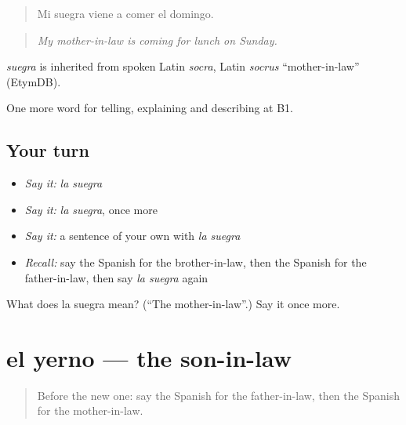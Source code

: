 \begin{quote}
Mi suegra viene a comer el domingo.
\end{quote}

\begin{quote}
\emph{My mother-in-law is coming for lunch on Sunday.}
\end{quote}

\begin{cousinweb}
\emph{suegra} is inherited from spoken Latin \emph{socra}, Latin \emph{socrus} \textquotedblleft{}mother-in-law\textquotedblright{} (EtymDB).
\end{cousinweb}

\begin{grammarlens}[title={What you've built}]
One more word for telling, explaining and describing at B1.
\end{grammarlens}

\subsection*{Your turn}
\begin{itemize}
\raggedright
  \item \emph{Say it:} \emph{la suegra}
  \item \emph{Say it:} \emph{la suegra}, once more
  \item \emph{Say it:} a sentence of your own with \emph{la suegra}
  \item \emph{Recall:} say the Spanish for the brother-in-law, then the Spanish for the father-in-law, then say \emph{la suegra} again
\end{itemize}

\begin{tcolorbox}[breakable,colback=teal!4,colframe=teal!35!black,title={Before you move on}]
What does la suegra mean? (\textquotedblleft{}The mother-in-law\textquotedblright{}.) Say it once more.
\end{tcolorbox}
\section[el yerno]{el yerno — the son-in-law}

\label{lesson:ES-C747-yerno}



\begin{quote}
Before the new one: say the Spanish for the father-in-law, then the Spanish for the mother-in-law.
\end{quote}


